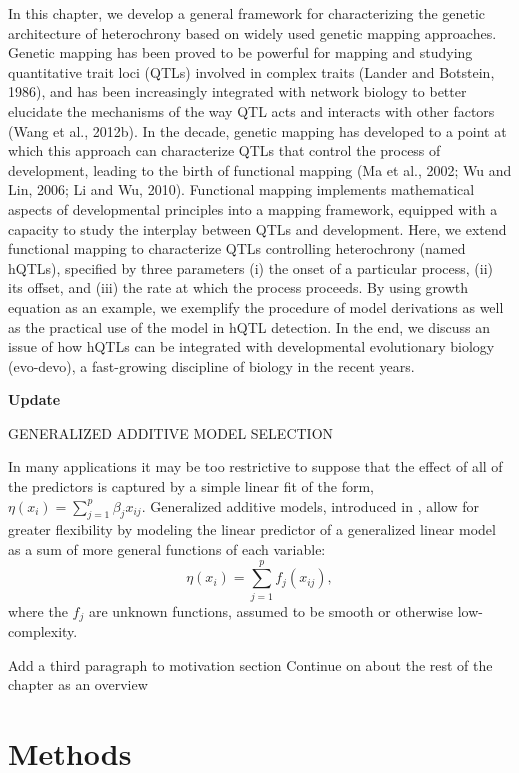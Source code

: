 \documentclass[]{book}
\theoremstyle{definition}
\theoremstyle{definition}
\theoremstyle{remark}
\begin{document}
In this chapter, we develop a general framework for characterizing the
genetic architecture of heterochrony based on widely used genetic
mapping approaches. Genetic mapping has been proved to be powerful for
mapping and studying quantitative trait loci (QTLs) involved in complex
traits (Lander and Botstein, 1986), and has been increasingly integrated
with network biology to better elucidate the mechanisms of the way QTL
acts and interacts with other factors (Wang et al., 2012b). In the
decade, genetic mapping has developed to a point at which this approach
can characterize QTLs that control the process of development, leading
to the birth of functional mapping (Ma et al., 2002; Wu and Lin, 2006;
Li and Wu, 2010). Functional mapping implements mathematical aspects of
developmental principles into a mapping framework, equipped with a
capacity to study the interplay between QTLs and development. Here, we
extend functional mapping to characterize QTLs controlling heterochrony
(named hQTLs), specified by three parameters (i) the onset of a
particular process, (ii) its offset, and (iii) the rate at which the
process proceeds. By using growth equation as an example, we exemplify
the procedure of model derivations as well as the practical use of the
model in hQTL detection. In the end, we discuss an issue of how hQTLs
can be integrated with developmental evolutionary biology (evo-devo), a
fast-growing discipline of biology in the recent years.

\textbf{Update}

GENERALIZED ADDITIVE MODEL SELECTION \cite{chouldechova2015generalized}

In many applications it may be too restrictive to suppose that the
effect of all of the predictors is captured by a simple linear fit of
the form, \(η(x_i) = \sum_{j=1}^p \beta_jx_{ij}\). Generalized additive
models, introduced in \cite{hastie1990generalized}, allow for greater
flexibility by modeling the linear predictor of a generalized linear
model as a sum of more general functions of each variable:
\[η(x_i) = \sum_{j=1}^p f_j(x_{ij}),\] where the \(f_j\) are unknown
functions, assumed to be smooth or otherwise low-complexity.

Add a third paragraph to motivation section Continue on about the rest
of the chapter as an overview

\section{Methods}\label{methods-2}
\end{document}
